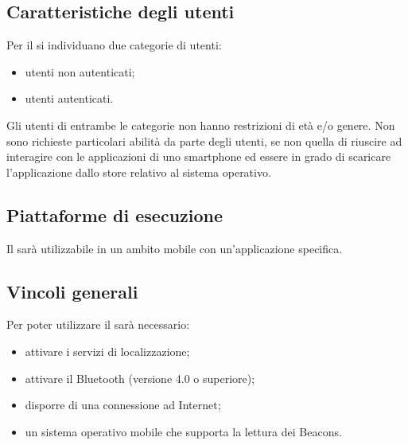 	\subsection{Caratteristiche degli utenti}
	\label{sub:Caratteristiche degli utenti}
		Per il  si individuano due categorie di utenti:
		\begin{itemize}
			\item utenti non autenticati;
			\item utenti autenticati.
		\end{itemize}
		Gli utenti di entrambe le categorie non hanno restrizioni di età e/o genere. Non sono richieste particolari abilità da parte degli utenti, se non quella di riuscire ad interagire con le applicazioni di uno smartphone ed essere in grado di scaricare l'applicazione dallo store relativo al sistema operativo.
		
	\subsection{Piattaforme di esecuzione}
		Il  sarà utilizzabile in un ambito mobile con un'applicazione specifica.
		
	\subsection{Vincoli generali}
	Per poter utilizzare il  sarà necessario:
	\begin{itemize}
		\item attivare i servizi di localizzazione;
		\item attivare il Bluetooth (versione 4.0 o superiore);
		\item disporre di una connessione ad Internet;
		\item un sistema operativo mobile che supporta la lettura dei Beacons.
	\end{itemize}